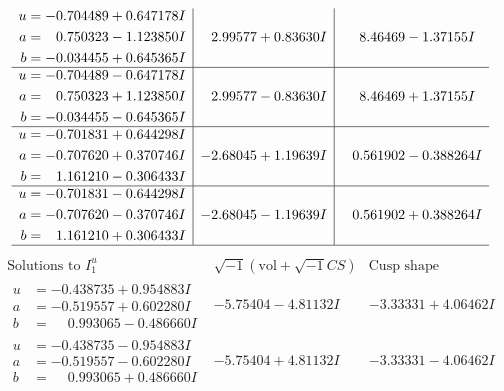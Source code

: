 \documentclass[1p]{elsarticle_modified}
\theoremstyle{definition}
\newcommand{\I}{\sqrt{-1}}
\begin{document}
$$\begin{array}{c|c|c}
\begin{aligned}
u &= -0.704489 + 0.647178 I \\
a &= \phantom{-}0.750323 - 1.123850 I \\
b &= -0.034455 + 0.645365 I\end{aligned}
 & \phantom{-}2.99577 + 0.83630 I & \phantom{-}8.46469 - 1.37155 I \\ \hline\begin{aligned}
u &= -0.704489 - 0.647178 I \\
a &= \phantom{-}0.750323 + 1.123850 I \\
b &= -0.034455 - 0.645365 I\end{aligned}
 & \phantom{-}2.99577 - 0.83630 I & \phantom{-}8.46469 + 1.37155 I \\ \hline\begin{aligned}
u &= -0.701831 + 0.644298 I \\
a &= -0.707620 + 0.370746 I \\
b &= \phantom{-}1.161210 - 0.306433 I\end{aligned}
 & -2.68045 + 1.19639 I & \phantom{-}0.561902 - 0.388264 I \\ \hline\begin{aligned}
u &= -0.701831 - 0.644298 I \\
a &= -0.707620 - 0.370746 I \\
b &= \phantom{-}1.161210 + 0.306433 I\end{aligned}
 & -2.68045 - 1.19639 I & \phantom{-}0.561902 + 0.388264 I\\
 \hline 
 \end{array}$$\newpage$$\begin{array}{c|c|c}  
\text{Solutions to }I^u_{1}& \I (\text{vol} + \sqrt{-1}CS) & \text{Cusp shape}\\
 \hline 
\begin{aligned}
u &= -0.438735 + 0.954883 I \\
a &= -0.519557 + 0.602280 I \\
b &= \phantom{-}0.993065 - 0.486660 I\end{aligned}
 & -5.75404 - 4.81132 I & -3.33331 + 4.06462 I \\ \hline\begin{aligned}
u &= -0.438735 - 0.954883 I \\
a &= -0.519557 - 0.602280 I \\
b &= \phantom{-}0.993065 + 0.486660 I\end{aligned}
 & -5.75404 + 4.81132 I & -3.33331 - 4.06462 I \\ \hline\begin{aligned}

\end{aligned}
\end{array}$$
\end{document}
